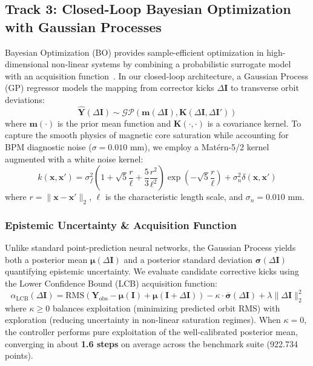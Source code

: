 \documentclass[11pt,a4paper]{article}
\begin{document}
\subsection{Track 3: Closed-Loop Bayesian Optimization with Gaussian Processes}
Bayesian Optimization (BO) provides sample-efficient optimization in high-dimensional non-linear systems by combining a probabilistic surrogate model with an acquisition function~\cite{roussel2023turnkey, edelen2020machine}. In our closed-loop architecture, a Gaussian Process (GP) regressor models the mapping from corrector kicks $\Delta \mathbf{I}$ to transverse orbit deviations:
\begin{equation}
    \hat{\mathbf{Y}}(\Delta \mathbf{I}) \sim \mathcal{GP}\left(\mathbf{m}(\Delta \mathbf{I}), \mathbf{K}(\Delta \mathbf{I}, \Delta \mathbf{I}')\right)
\end{equation}
where $\mathbf{m}(\cdot)$ is the prior mean function and $\mathbf{K}(\cdot, \cdot)$ is a covariance kernel. To capture the smooth physics of magnetic core saturation while accounting for BPM diagnostic noise ($\sigma = 0.010\text{ mm}$), we employ a Mat\'ern-5/2 kernel augmented with a white noise kernel:
\begin{equation}
    k(\mathbf{x}, \mathbf{x}') = \sigma_f^2 \left( 1 + \sqrt{5}\frac{r}{\ell} + \frac{5}{3}\frac{r^2}{\ell^2} \right) \exp\left( -\sqrt{5}\frac{r}{\ell} \right) + \sigma_n^2 \delta(\mathbf{x}, \mathbf{x}')
\end{equation}
where $r = \|\mathbf{x} - \mathbf{x}'\|_2$, $\ell$ is the characteristic length scale, and $\sigma_n = 0.010\text{ mm}$.

\subsubsection{Epistemic Uncertainty \& Acquisition Function}
Unlike standard point-prediction neural networks, the Gaussian Process yields both a posterior mean $\boldsymbol{\mu}(\Delta \mathbf{I})$ and a posterior standard deviation $\boldsymbol{\sigma}(\Delta \mathbf{I})$ quantifying epistemic uncertainty.
We evaluate candidate corrective kicks using the Lower Confidence Bound (LCB) acquisition function:
\begin{equation}
    \alpha_{\text{LCB}}(\Delta \mathbf{I}) = \text{RMS}\left( \mathbf{Y}_{\text{obs}} - \boldsymbol{\mu}(\mathbf{I}) + \boldsymbol{\mu}(\mathbf{I} + \Delta \mathbf{I}) \right) - \kappa \cdot \overline{\boldsymbol{\sigma}}(\Delta \mathbf{I}) + \lambda \|\Delta \mathbf{I}\|_2^2
\end{equation}
where $\kappa \ge 0$ balances exploitation (minimizing predicted orbit RMS) with exploration (reducing uncertainty in non-linear saturation regimes). When $\kappa = 0$, the controller performs pure exploitation of the well-calibrated posterior mean, converging in about \textbf{1.6 steps} on average across the benchmark suite (922.734 points).
\end{document}
